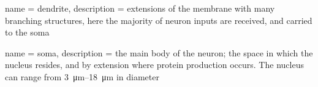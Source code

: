 

\usepackage{glossaries}

\makeglossaries

{
        name = {dendrite},
        description = {extensions of the membrane with many branching structures, here the majority of neuron inputs are received, and carried to the soma}
}

{
        name = {soma},
        description = {the main body of the neuron; the space in which the nucleus resides, and by extension where protein production occurs. The nucleus can range from \qtyrange{3}{18}{\um} in diameter}
}



